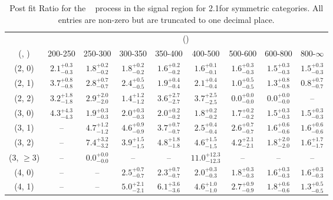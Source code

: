 \begin{table}[h!]
\tiny
\centering
\caption{Post fit Ratio for the \zInv~ process in the signal region for 2.1\ifb for symmetric categories. All entries are non-zero but are truncated to one decimal place.\label{tab:ratioseppost_sig_zinv_sym}}
\begin{tabular}
{ccccccccc}
	\hline\hline
	& \multicolumn{8}{c}{\scalht (\gev)} \\ 
	 (\njet,  \nb) & 200-250 & 250-300 & 300-350 & 350-400 & 400-500 & 500-600 & 600-800 & 800-$\infty$ \\ [0.8ex] 
\hline
	(2, 0) & $2.1^{+ 0.3 }_{- 0.3 }$ & $1.8^{+ 0.2 }_{- 0.2 }$ & $1.8^{+ 0.2 }_{- 0.2 }$ & $1.6^{+ 0.2 }_{- 0.2 }$ & $1.6^{+ 0.1 }_{- 0.1 }$ & $1.6^{+ 0.3 }_{- 0.3 }$ & $1.5^{+ 0.3 }_{- 0.3 }$ & $1.5^{+ 0.3 }_{- 0.3 }$ \\[0.5ex] 
	(2, 1) & $3.7^{+ 0.8 }_{- 0.8 }$ & $2.8^{+ 0.7 }_{- 0.7 }$ & $2.4^{+ 0.5 }_{- 0.5 }$ & $1.9^{+ 0.4 }_{- 0.4 }$ & $2.1^{+ 0.4 }_{- 0.4 }$ & $1.0^{+ 0.5 }_{- 0.5 }$ & $1.3^{+ 0.8 }_{- 0.8 }$ & $0.8^{+ 0.7 }_{- 0.7 }$ \\[0.5ex] 
	(2, 2) & $3.2^{+ 1.8 }_{- 1.8 }$ & $2.9^{+ 2.0 }_{- 2.0 }$ & $1.4^{+ 1.2 }_{- 1.2 }$ & $3.6^{+ 2.7 }_{- 2.7 }$ & $3.7^{+ 2.5 }_{- 2.5 }$ & $0.0^{+ 0.0 }_{- 0.0 }$ & $0.0^{+ 0.0 }_{- 0.0 }$ & -- \\[0.5ex] 
	(3, 0) & $4.3^{+ 4.3 }_{- 4.3 }$ & $1.9^{+ 0.3 }_{- 0.3 }$ & $2.0^{+ 0.3 }_{- 0.3 }$ & $2.0^{+ 0.2 }_{- 0.2 }$ & $1.8^{+ 0.2 }_{- 0.2 }$ & $1.7^{+ 0.2 }_{- 0.2 }$ & $1.5^{+ 0.3 }_{- 0.3 }$ & $1.5^{+ 0.3 }_{- 0.3 }$ \\[0.5ex] 
	(3, 1) & -- & $4.7^{+ 1.2 }_{- 1.2 }$ & $4.6^{+ 0.9 }_{- 0.9 }$ & $3.7^{+ 0.7 }_{- 0.7 }$ & $2.5^{+ 0.4 }_{- 0.4 }$ & $2.6^{+ 0.7 }_{- 0.7 }$ & $1.6^{+ 0.6 }_{- 0.6 }$ & $1.6^{+ 0.6 }_{- 0.6 }$ \\[0.5ex] 
	(3, 2) & -- & $7.4^{+ 3.2 }_{- 3.2 }$ & $3.9^{+ 1.5 }_{- 1.5 }$ & $4.8^{+ 1.8 }_{- 1.8 }$ & $4.6^{+ 1.5 }_{- 1.5 }$ & $4.2^{+ 2.1 }_{- 2.1 }$ & $1.8^{+ 2.0 }_{- 2.0 }$ & $1.6^{+ 1.7 }_{- 1.7 }$ \\[0.5ex] 
	(3, $\ge3$) & -- & $0.0^{+ 0.0 }_{- 0.0 }$ & -- & -- & $11.0^{+ 12.3 }_{- 12.3 }$ & -- & -- & -- \\[0.5ex] 
	(4, 0) & -- & -- & $2.5^{+ 0.7 }_{- 0.7 }$ & $2.3^{+ 0.7 }_{- 0.7 }$ & $2.0^{+ 0.3 }_{- 0.3 }$ & $1.8^{+ 0.3 }_{- 0.3 }$ & $1.6^{+ 0.3 }_{- 0.3 }$ & $1.6^{+ 0.3 }_{- 0.3 }$ \\[0.5ex] 
	(4, 1) & -- & -- & $5.0^{+ 2.1 }_{- 2.1 }$ & $6.1^{+ 3.6 }_{- 3.6 }$ & $4.6^{+ 1.0 }_{- 1.0 }$ & $2.7^{+ 0.9 }_{- 0.9 }$ & $1.8^{+ 0.6 }_{- 0.6 }$ & $1.3^{+ 0.5 }_{- 0.5 }$ \\[0.5ex] 

\end{tabular}
\end{table}
